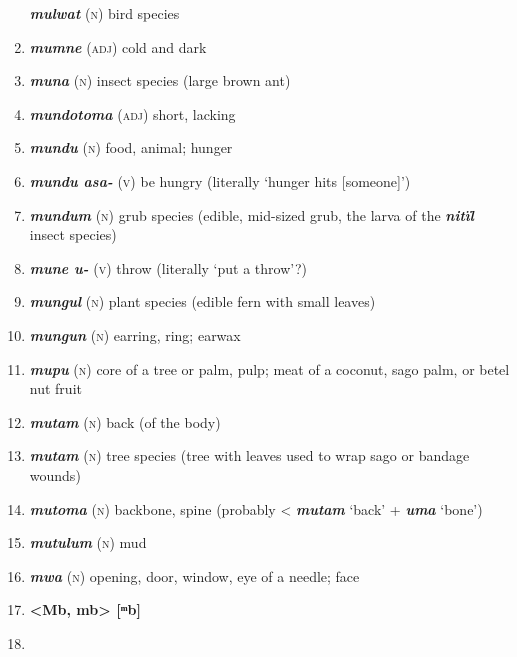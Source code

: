 \begin{enumerate}[noitemsep, label={}, align=left, widest=190, labelsep=1ex,leftmargin=*,itemindent=-10pt]
\textbf{\textit{mulwat}} (\textsc{n}) bird species \item 
\textbf{\textit{mumne}} (\textsc{adj}) cold and dark \item 
\textbf{\textit{muna}} (\textsc{n}) insect species (large brown ant) \item 
\textbf{\textit{mundotoma}} (\textsc{adj}) short, lacking \item 
\textbf{\textit{mundu}} (\textsc{n}) food, animal; hunger \item 
\textbf{\textit{mundu asa-}} (\textsc{v}) be hungry (literally ‘hunger hits [someone]’) \item 
\textbf{\textit{mundum}} (\textsc{n}) grub species (edible, mid-sized grub, the larva of the \textbf{\textit{nitïl}} insect species) \item 
\textbf{\textit{mune u-}} (\textsc{v}) throw (literally ‘put a throw’?) \item 
\textbf{\textit{mungul}} (\textsc{n}) plant species (edible fern with small leaves) \item 
\textbf{\textit{mungun}} (\textsc{n}) earring, ring; earwax \item 
\textbf{\textit{mupu}} (\textsc{n}) core of a tree or palm, pulp; meat of a coconut, sago palm, or betel nut fruit \item 
\textbf{\textit{mutam}} (\textsc{n}) back (of the body) \item 
\textbf{\textit{mutam}} (\textsc{n}) tree species (tree with leaves used to wrap sago or bandage wounds) \item 
\textbf{\textit{mutoma}} (\textsc{n}) backbone, spine (probably < \textbf{\textit{mutam}} ‘back’ + \textbf{\textit{uma}} ‘bone’) \item 
\textbf{\textit{mutulum}} (\textsc{n}) mud \item 
\textbf{\textit{mwa}} (\textsc{n}) opening, door, window, eye of a needle; face\\ \item 

\noindent \textbf{<Mb, mb>    [ᵐb]}\\ \item 


\end{enumerate}

